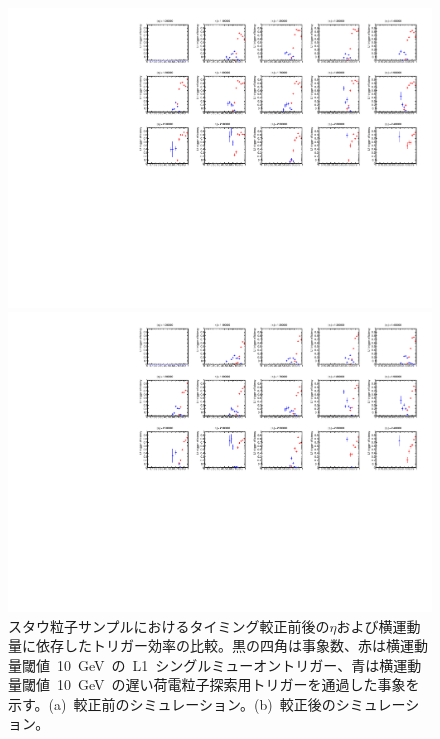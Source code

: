 \begin{figure}[tbp]
    \begin{minipage}{0.49\hsize}
    \centering   
    \includegraphics[width=\textwidth,page=14]{img/rec/stau_600_ori.pdf}
    \subcaption{}
    \end{minipage}
    \begin{minipage}{0.49\hsize}
    \centering   
    \includegraphics[width=\textwidth,page=14]{img/rec/stau_600.pdf}
    \subcaption{}
    \end{minipage}
    \caption[スタウ粒子サンプルにおけるタイミング較正前後の$\eta$および横運動量に依存したトリガー効率の比較]{スタウ粒子サンプルにおけるタイミング較正前後の$\eta$および横運動量に依存したトリガー効率の比較。黒の四角は事象数、赤は横運動量閾値~10~GeV~の~L1~シングルミューオントリガー、青は横運動量閾値~10~GeV~の遅い荷電粒子探索用トリガーを通過した事象を示す。(a)~較正前のシミュレーション。(b)~較正後のシミュレーション。}\label{fig:tripteta}
\end{figure}
